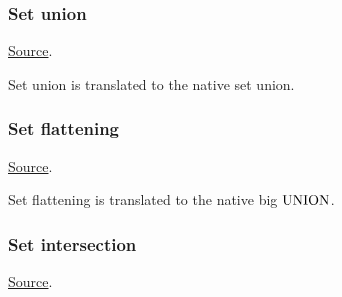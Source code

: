 \subsubsection{ Set union}
\href{https://github.com/saltiniroberto/ssf/blob/7ea6e18093d9da3154b4e396dd435549f687e6b9/high_level/common/pythonic_code_generic.py#L31-L32}{Source}.



\begin{mathpar}
\end{mathpar}
Set union is translated to the \tlap{} native set union.

\subsubsection{ Set flattening}
\href{https://github.com/saltiniroberto/ssf/blob/7ea6e18093d9da3154b4e396dd435549f687e6b9/high_level/common/pythonic_code_generic.py#L35-L36}{Source}.



\begin{mathpar}
\end{mathpar}
Set flattening is translated to the \tlap{} native big $\UNION$.

\subsubsection{Set intersection}
\href{https://github.com/saltiniroberto/ssf/blob/7ea6e18093d9da3154b4e396dd435549f687e6b9/high_level/common/pythonic_code_generic.py#L42-L43}{Source}.


